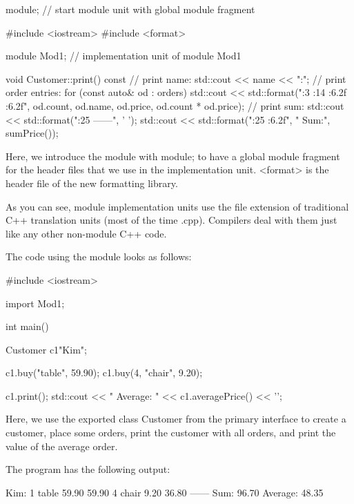 \begin{cpp}
module; // start module unit with global module fragment

#include <iostream>
#include <format>

module Mod1; // implementation unit of module Mod1

void Customer::print() const
{
	// print name:
	std::cout << name << ":\n";
	// print order entries:
	for (const auto& od : orders) {
		std::cout << std::format("{:3} {:14} {:6.2f} {:6.2f}\n",
								  od.count, od.name, od.price, od.count * od.price);
	}
	// print sum:
	std::cout << std::format("{:25} ------\n", ' ');
	std::cout << std::format("{:25} {:6.2f}\n", " Sum:", sumPrice());
}
\end{cpp}

Here, we introduce the module with module; to have a global module fragment for the header files that we use in the implementation unit. <format> is the header file of the new formatting library.

As you can see, module implementation units use the file extension of traditional C++ translation units (most of the time .cpp). Compilers deal with them just like any other non-module C++ code.


The code using the module looks as follows:


\begin{cpp}
#include <iostream>

import Mod1;

int main()
{
	Customer c1{"Kim"};
	
	c1.buy("table", 59.90);
	c1.buy(4, "chair", 9.20);
	
	c1.print();
	std::cout << " Average: " << c1.averagePrice() << '\n';
}
\end{cpp}

Here, we use the exported class Customer from the primary interface to create a customer, place some orders, print the customer with all orders, and print the value of the average order.

The program has the following output:

\begin{shell}
Kim:
  1 table        59.90   59.90
  4 chair         9.20   36.80
                        ------
    Sum:                 96.70
Average: 48.35
\end{shell}

